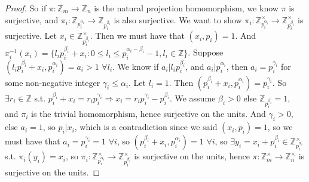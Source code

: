 \documentclass[10pt,oneside,reqno]{amsart}
\theoremstyle{plain}
\theoremstyle{definition}
\begin{document}
\begin{proof}
So if $\pi:\mathbb{Z}_m \to \mathbb{Z}_n$ is the natural projection homomorphism, we know $\pi$ is surjective, and $\pi_i:\mathbb{Z}_{p_i^{\alpha_i}} \to \mathbb{Z}_{p_i^{\beta_i}}$ is also surjective. We want to show $\pi_i:\mathbb{Z}_{p_i^{\alpha_i}}^{\times} \to \mathbb{Z}_{p_i^{\beta_i}}^{\times}$ is surjective. Let $x_i \in \mathbb{Z}_{p_i^{\beta_i}}^{\times}$. Then we must have that $(x_i,p_i) = 1$. And $\pi_i^{-1}(x_i) = \{l_ip_i^{\beta_i} + x_i: 0\leq l_i \leq p_i^{\alpha_i - \beta_i} - 1, l_i \in \mathbb{Z}\}$. Suppose $(l_ip_i^{\beta_i} + x_i,p_i^{\alpha_i}) = a_i > 1$ $\forall l_i$. We know if $a_i|l_ip_i^{\beta_i}$, and $a_i|p_i^{\alpha_i}$, then $a_i= p_i^{\gamma_i}$ for some non-negative integer $\gamma_i \leq \alpha_i$. Let $l_i = 1$. Then $(p_i^{\beta_i} + x_i,p_i^{\alpha_i}) = p_i^{\gamma_i}$. So $\exists r_i \in \mathbb{Z}$ s.t. $p_i^{\beta_i} + x_i = r_ip_i^{\gamma_i} \Rightarrow x_i =  r_ip_i^{\gamma_i} - p_i^{\beta_i}$. We assume $\beta_i > 0$ else $\mathbb{Z}_{p_i^{\beta_i}} = 1$, and $\pi_i$ is the trivial homomorphism, hence surjective on the units. And $\gamma_i > 0$, else $a_i = 1$, so $p_i|x_i$, which is a contradiction since we said $(x_i,p_i) = 1$, so we must have that $a_i = p_i^{\gamma_i} = 1$ $\forall i$, so $(p_i^{\beta_i} + x_i,p_i^{\alpha_i}) = 1$ $\forall i$, so $\exists y_i = x_i + p_i^{\beta_i} \in \mathbb{Z}_{p_i^{\alpha_i}}^{\times}$ s.t. $\pi_i(y_i) = x_i$, so $\pi_i:\mathbb{Z}_{p_i^{\alpha_i}}^{\times} \to \mathbb{Z}_{p_i^{\beta_i}}^{\times}$ is surjective on the units, hence $\pi:\mathbb{Z}_m^{\times} \to \mathbb{Z}_n^{\times}$ is surjective on the units. 
\end{proof}

\vspace{1mm}
\end{document}
